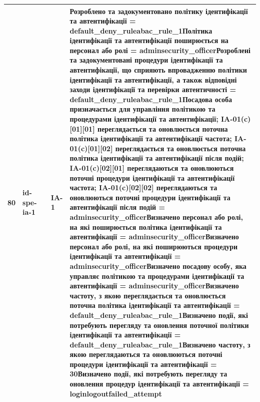 \documentclass[10pt]{article}
\begin{document}
\begin{longtable}{|c|>{\raggedright\arraybackslash}p{4cm}|>{\raggedright\arraybackslash}p{2.5cm}|>{\raggedright\arraybackslash}p{3.5cm}|>{\raggedright\arraybackslash}p{5.5cm}|}
80 & id-spe-ia-1 &  & IA-1 & Розроблено та задокументовано політику ідентифікації та автентифікації = \textbf{default\_\allowbreak{}deny\_\allowbreak{}ruleabac\_\allowbreak{}rule\_\allowbreak{}1}\newline Політика ідентифікації та автентифікації поширюється на персонал або ролі = \textbf{adminsecurity\_\allowbreak{}officer}\newline Розроблені та задокументовані процедури ідентифікації та автентифікації, що сприяють впровадженню політики ідентифікації та автентифікації, а також відповідні заходи ідентифікації та перевірки автентичності = \textbf{default\_\allowbreak{}deny\_\allowbreak{}ruleabac\_\allowbreak{}rule\_\allowbreak{}1}\newline Посадова особа призначається для управління політикою та процедурами ідентифікації та автентифікації; IA-01(c)[01][01] переглядається та оновлюється поточна політика ідентифікації та автентифікації частота; IA-01(c)[01][02] переглядається та оновлюється поточна політика ідентифікації та автентифікації після подій; IA-01(c)[02][01] переглядаються та оновлюються поточні процедури ідентифікації та автентифікації частота; IA-01(c)[02][02] переглядаються та оновлюються поточні процедури ідентифікації та автентифікації після подій = \textbf{adminsecurity\_\allowbreak{}officer}\newline Визначено персонал або ролі, на які поширюється політика ідентифікації та автентифікації = \textbf{adminsecurity\_\allowbreak{}officer}\newline Визначено персонал або ролі, на які поширюються процедури ідентифікації та автентифікації = \textbf{adminsecurity\_\allowbreak{}officer}\newline Визначено посадову особу, яка управляє політикою та процедурами ідентифікації та автентифікації = \textbf{adminsecurity\_\allowbreak{}officer}\newline Визначено частоту, з якою переглядається та оновлюється поточна політика ідентифікації та автентифікації = \textbf{default\_\allowbreak{}deny\_\allowbreak{}ruleabac\_\allowbreak{}rule\_\allowbreak{}1}\newline Визначено події, які потребують перегляду та оновлення поточної політики ідентифікації та автентифікації = \textbf{default\_\allowbreak{}deny\_\allowbreak{}ruleabac\_\allowbreak{}rule\_\allowbreak{}1}\newline Визначено частоту, з якою переглядаються та оновлюються поточні процедури ідентифікації та автентифікації = \textbf{30}\newline Визначено події, які потребують перегляду та оновлення процедур ідентифікації та автентифікації = \textbf{loginlogoutfailed\_\allowbreak{}attempt} \\ \hline

\end{longtable}
\end{document}

